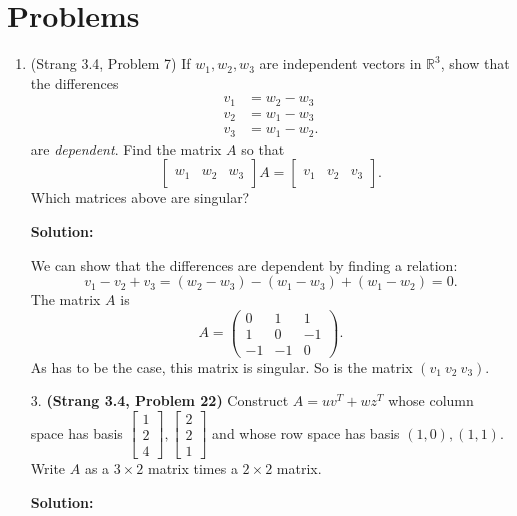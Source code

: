 \documentclass[11pt]{article}
\newcommand{\rr}{\mathbb{R}}
\begin{document}
\section{Problems}

\begin{enumerate}


\item (Strang 3.4, Problem 7) If $w_1, w_2, w_3$ are independent vectors in $\rr^3$, show that the differences 
\begin{align*}
v_1 &= w_2 - w_3 \\
v_2 &= w_1 - w_3 \\
v_3 &= w_1 - w_2.
\end{align*}
are \emph{dependent}.  Find the matrix $A$ so that
\[ \begin{bmatrix} \\ w_1 & w_2 & w_3 \\ &\end{bmatrix}A = \begin{bmatrix} \\ v_1 & v_2 & v_3 \\ &\end{bmatrix}.\]
Which matrices above are singular?

\textbf{Solution:}

We can show that the differences are dependent by finding a relation:
\[v_1 - v_2 + v_3 = (w_2-w_3) - (w_1-w_3) + (w_1 - w_2) = 0.\]
The matrix $A$ is
\[A = \begin{pmatrix} 0 & 1 & 1 \\ 1 & 0 & -1 \\ -1 & -1 & 0 \end{pmatrix}. \]
As has to be the case, this matrix is singular.  So is the matrix $(v_1 \ v_2 \ v_3)$.

\item[3.] \textbf{(Strang 3.4, Problem 22)} Construct $A = uv^T + wz^T$ whose column space has basis $\begin{bmatrix} 1 \\ 2 \\ 4 \end{bmatrix}, \begin{bmatrix} 2 \\ 2 \\ 1 \end{bmatrix}$ and whose row space has basis $(1,0), (1,1)$.  Write $A$ as a $3 \times 2$ matrix times a $2 \times 2$ matrix.

\textbf{Solution:}


\end{enumerate}
\end{document}
